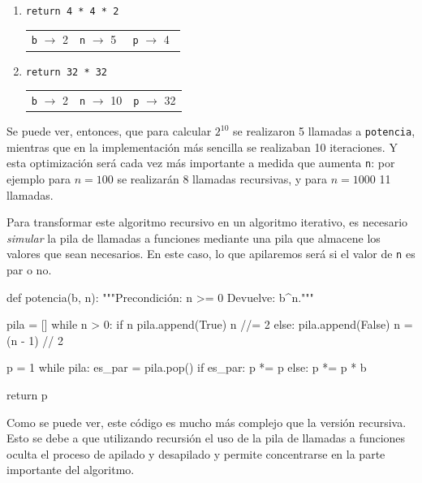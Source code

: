 \begin{enumerate}
\item \hspace{2cm} \verb!return 4 * 4 * 2   !
\hspace{3cm} \begin{tabular}{|c|c|c|}\verb|b| $\rightarrow$ 2 & \verb|n| $\rightarrow$ 5$\;\,$
& \verb|p| $\rightarrow$ 4$\;\,$ \end{tabular}
\item \hspace{1cm} \verb!return 32 * 32     !
\hspace{4cm} \begin{tabular}{|c|c|c|}\verb|b| $\rightarrow$ 2 & \verb|n| $\rightarrow$ 10
& \verb|p| $\rightarrow$ 32 \end{tabular}
\end{enumerate}

Se puede ver, entonces, que para calcular $2^{10}$ se realizaron 5 llamadas a
\lstinline!potencia!, mientras que en la implementación más sencilla se
realizaban 10 iteraciones. Y esta optimización será cada vez más importante
a medida que aumenta \lstinline!n!: por ejemplo para $n = 100$ se
realizarán 8 llamadas recursivas, y para $n = 1000$ 11 llamadas.


Para transformar este algoritmo recursivo en un algoritmo iterativo, es
necesario \emph{simular} la pila de llamadas a funciones mediante una pila que
almacene los valores que sean necesarios.  En este caso, lo que apilaremos será
si el valor de \lstinline!n! es par o no.

\begin{codigo-python-sn}
def potencia(b, n):
    """Precondición: n >= 0
       Devuelve: b^n."""

    pila = []
    while n > 0:
        if n %
            pila.append(True)
            n //= 2
        else:
            pila.append(False)
            n = (n - 1) // 2

    p = 1
    while pila:
        es_par = pila.pop()
        if es_par:
            p *= p
        else:
            p *= p * b

    return p
\end{codigo-python-sn}

Como se puede ver, este código es mucho más complejo que la versión recursiva.
Esto se debe a que utilizando recursión el uso de la pila de llamadas a
funciones oculta el proceso de apilado y desapilado y permite concentrarse
en la parte importante del algoritmo.

